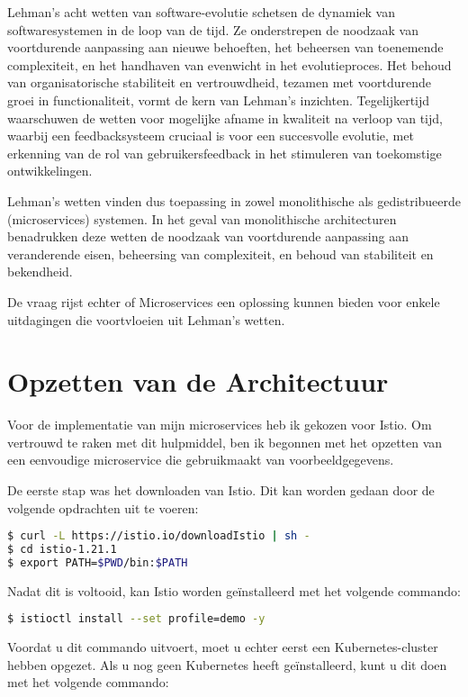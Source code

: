 Lehman's acht wetten van software-evolutie schetsen de dynamiek van softwaresystemen in de loop van de tijd. Ze onderstrepen de noodzaak van voortdurende aanpassing aan nieuwe behoeften, het beheersen van toenemende complexiteit, en het handhaven van evenwicht in het evolutieproces. Het behoud van organisatorische stabiliteit en vertrouwdheid, tezamen met voortdurende groei in functionaliteit, vormt de kern van Lehman's inzichten. Tegelijkertijd waarschuwen de wetten voor mogelijke afname in kwaliteit na verloop van tijd, waarbij een feedbacksysteem cruciaal is voor een succesvolle evolutie, met erkenning van de rol van gebruikersfeedback in het stimuleren van toekomstige ontwikkelingen. 

Lehman's wetten vinden dus toepassing in zowel monolithische als gedistribueerde (microservices) systemen. In het geval van monolithische architecturen benadrukken deze wetten de noodzaak van voortdurende aanpassing aan veranderende eisen, beheersing van complexiteit, en behoud van stabiliteit en bekendheid. 

De vraag rijst echter of Microservices een oplossing kunnen bieden voor enkele uitdagingen die voortvloeien uit Lehman's wetten.


\section{Opzetten van de Architectuur}
\label{sec:architectuur}
Voor de implementatie van mijn microservices heb ik gekozen voor Istio. Om vertrouwd te raken met dit hulpmiddel, ben ik begonnen met het opzetten van een eenvoudige microservice die gebruikmaakt van voorbeeldgegevens.

De eerste stap was het downloaden van Istio. Dit kan worden gedaan door de volgende opdrachten uit te voeren:

\begin{lstlisting}[language=bash]
$ curl -L https://istio.io/downloadIstio | sh -
$ cd istio-1.21.1
$ export PATH=$PWD/bin:$PATH
\end{lstlisting}

Nadat dit is voltooid, kan Istio worden geïnstalleerd met het volgende commando:

\begin{lstlisting}[language=bash]
$ istioctl install --set profile=demo -y
\end{lstlisting}

Voordat u dit commando uitvoert, moet u echter eerst een Kubernetes-cluster hebben opgezet. Als u nog geen Kubernetes heeft geïnstalleerd, kunt u dit doen met het volgende commando:

